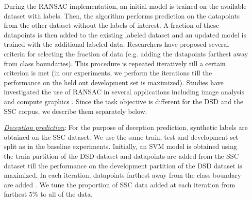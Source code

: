 \documentclass{article}
\begin{document}
\begin{spacing}{0.89}
During the RANSAC \cite{fischler1981random} implementation, an initial model is trained on the available dataset with labels.
Then, the algorithm performs prediction on the datapoints from the other dataset without the labels of interest.
A fraction of these datapoints is then added to the existing labeled dataset and an updated model is trained with the additional labeled data.
Researchers have proposed several criteria for selecting the fraction of data (e.g. adding the datapoints farthest away from class boundaries).
This procedure is repeated iteratively till a certain criterion is met (in our experiments, we perform the iterations till the performance on the held out development set is maximized).
Studies have investigated the use of RANSAC in several applications including image analysis \cite{fischler1981random} and compute graphics \cite{caraiman2009new}. 
Since the task objective is different for the DSD and the SSC corpus, we describe them separately below. 

\underline{\it Deception prediction}:  
For the purpose of deception prediction, synthetic labels are obtained on the SSC dataset.
We use the same train, test and development set split as in the baseline experiments.
Initially, an SVM model is obtained using the train partition of the DSD dataset and datapoints are added from the SSC dataset till the performance on the development partition of the DSD dataset is maximized.
In each iteration, datapoints farthest away from the class boundary are added \cite{raguram2008comparative}.
We tune the proportion of SSC data added at each iteration from farthest 5\% to all of the data.


\end{spacing}
\end{document}
